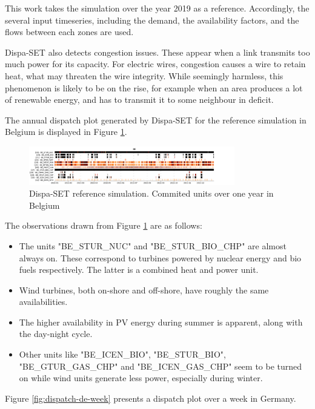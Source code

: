 This work takes the simulation over the year 2019 as a reference. Accordingly, the several input timeseries, including the demand, the availability factors, and the flows between each zones are used.

Dispa-SET also detects congestion issues. These appear when a link transmits too much power for its capacity. For electric wires, congestion causes a wire to retain heat, what may threaten the wire integrity. While seemingly harmless, this phenomenon is likely to be on the rise, for example when an area produces a lot of renewable energy, and has to transmit it to some neighbour in deficit.

The annual dispatch plot generated by Dispa-SET for the reference simulation in Belgium is displayed in Figure \ref{fig:dispatch-be}.

\begin{figure}[h]
    \centering
    \includegraphics[width=0.8\textwidth]{resources/images/commited-BE-year.png}
    \caption{Dispa-SET reference simulation. Commited units over one year in Belgium}
    \label{fig:dispatch-be}
\end{figure}

The observations drawn from Figure \ref{fig:dispatch-be} are as follows:
\begin{itemize}
    \item The units "BE\_STUR\_NUC" and "BE\_STUR\_BIO\_CHP" are almost always on. These correspond to turbines powered by nuclear energy and bio fuels respectively. The latter is a combined heat and power unit.
    \item Wind turbines, both on-shore and off-shore, have roughly the same availabilities.
    \item The higher availability in PV energy during summer is apparent, along with the day-night cycle.
    \item Other units like "BE\_ICEN\_BIO", "BE\_STUR\_BIO", "BE\_GTUR\_GAS\_CHP" and "BE\_ICEN\_GAS\_CHP" seem to be turned on while wind units generate less power, especially during winter.
\end{itemize}

Figure \ref{fig:dispatch-de-week} presents a dispatch plot over a week in Germany.

